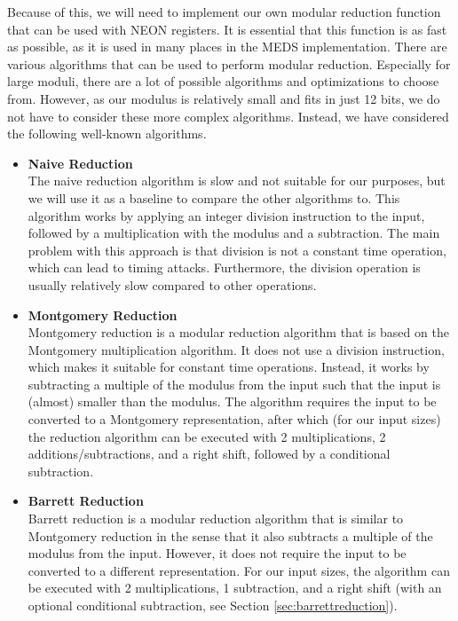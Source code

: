 \documentclass[11pt,a4paper]{report}
\theoremstyle{definition}
\begin{document}
Because of this, we will need to implement our own modular reduction function that can be used with NEON registers. It is essential that this function is as fast as possible, as it is used in many places in the MEDS implementation. There are various algorithms that can be used to perform modular reduction. Especially for large moduli, there are a lot of possible algorithms and optimizations to choose from. However, as our modulus is relatively small and fits in just 12 bits, we do not have to consider these more complex algorithms. Instead, we have considered the following well-known algorithms.
\begin{itemize}
  \item \textbf{Naive Reduction}\\
  The naive reduction algorithm is slow and not suitable for our purposes, but we will use it as a baseline to compare the other algorithms to. This algorithm works by applying an integer division instruction to the input, followed by a multiplication with the modulus and a subtraction. The main problem with this approach is that division is not a constant time operation, which can lead to timing attacks. Furthermore, the division operation is usually relatively slow compared to other operations.
  \item \textbf{Montgomery Reduction}\\
  Montgomery reduction is a modular reduction algorithm that is based on the Montgomery multiplication algorithm. It does not use a division instruction, which makes it suitable for constant time operations. Instead, it works by subtracting a multiple of the modulus from the input such that the input is (almost) smaller than the modulus. The algorithm requires the input to be converted to a Montgomery representation, after which (for our input sizes) the reduction algorithm can be executed with 2 multiplications, 2 additions/subtractions, and a right shift, followed by a conditional subtraction.
  \item \textbf{Barrett Reduction}\\
  Barrett reduction is a modular reduction algorithm that is similar to Montgomery reduction in the sense that it also subtracts a multiple of the modulus from the input. However, it does not require the input to be converted to a different representation. For our input sizes, the algorithm can be executed with 2 multiplications, 1 subtraction, and a right shift (with an optional conditional subtraction, see Section \ref{sec:barrettreduction}).
\end{itemize}
\end{document}

